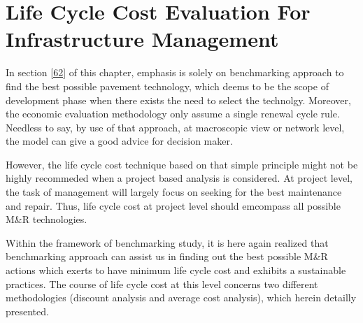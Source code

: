 \section{Life Cycle Cost Evaluation For Infrastructure Management}
\label{63}
In section \ref{62} of this chapter, emphasis is solely on benchmarking approach to find the best possible pavement technology, which deems to be the scope of development phase when there exists the need to select the technolgy. Moreover, the economic evaluation methodology only assume a single renewal cycle rule. Needless to say, by use of that approach, at macroscopic view or network level, the model can give a good advice for decision maker. 

However, the life cycle cost technique based on that simple principle might not be highly recommeded when a project based analysis is considered. At project level, the task of management will largely focus on seeking for the best maintenance and repair. Thus, life cycle cost at project level should emcompass all possible M\&R technologies. 

Within the framework of benchmarking study, it is here again realized that benchmarking approach can assist us in finding out the best possible M\&R actions which exerts to have minimum life cycle cost and exhibits a sustainable practices. The course of life cycle cost at this level concerns two different methodologies (discount analysis and average cost analysis), which herein detailly presented.
